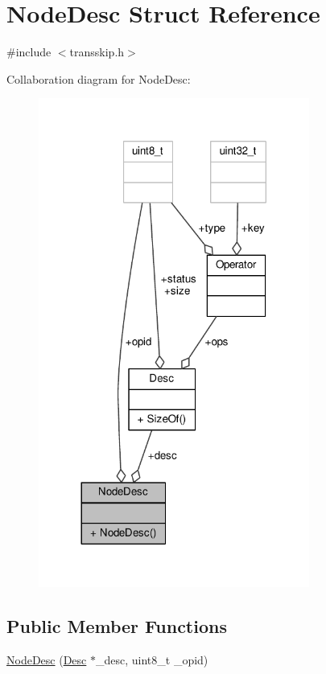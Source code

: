 \hypertarget{structNodeDesc}{\section{Node\-Desc Struct Reference}
\label{structNodeDesc}
}


{\ttfamily \#include $<$transskip.\-h$>$}



Collaboration diagram for Node\-Desc\-:
\nopagebreak
\begin{figure}[H]
\begin{center}
\leavevmode
\includegraphics[width=252pt]{structNodeDesc__coll__graph}
\end{center}
\end{figure}
\subsection*{Public Member Functions}
\begin{DoxyCompactItemize}
\item 
\hyperlink{structNodeDesc_a9314163196afccf7b756011844b75e38}{Node\-Desc} (\hyperlink{structDesc}{Desc} $\ast$\-\_\-desc, uint8\-\_\-t \-\_\-opid)
\end{DoxyCompactItemize}
